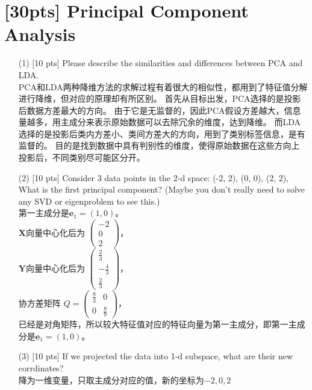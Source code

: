 \documentclass{article}
\begin{document}
\section{[30pts] Principal Component Analysis }
\begin{enumerate}
    \item [(1)] [10 pts] Please describe the similarities and differences between PCA and LDA.\\
    PCA和LDA两种降维方法的求解过程有着很大的相似性，都用到了特征值分解进行降维，但对应的原理却有所区别。
    首先从目标出发，PCA选择的是投影后数据方差最大的方向。
    由于它是无监督的，因此PCA假设方差越大，信息量越多，用主成分来表示原始数据可以去除冗余的维度，达到降维。
    而LDA选择的是投影后类内方差小、类间方差大的方向，用到了类别标签信息，是有监督的。
    目的是找到数据中具有判别性的维度，使得原始数据在这些方向上投影后，不同类别尽可能区分开。
	\item [(2)] [10 pts] Consider 3 data points in the 2-d space: (-2, 2), (0, 0), (2, 2), What is the first principal component? (Maybe you don't really need to solve any SVD or eigenproblem to see this.)\\
    第一主成分是$\boldsymbol{e}_1 = (1, 0)$。\\
    $\boldsymbol{X}$向量中心化后为
    $\begin{pmatrix}   -2\\0\\2    \end{pmatrix}$，\\
    $\boldsymbol{Y}$向量中心化后为
    $\begin{pmatrix}   \frac{2}{3}\\-\frac{4}{3}\\\frac{2}{3}    \end{pmatrix}$，\\
    协方差矩阵
    $Q = 
    \begin{pmatrix}
    \frac{8}{3} & 0\\
    0 & \frac{8}{9}
    \end{pmatrix}$，\\
    已经是对角矩阵，所以较大特征值对应的特征向量为第一主成分，即第一主成分是$\boldsymbol{e}_1 = (1, 0)$。
    \item [(3)] [10 pts] If we projected the data into 1-d subspace, what are their new corrdinates?\\
    降为一维变量，只取主成分对应的值，新的坐标为$-2, 0, 2$
\end{enumerate}
\end{document}
